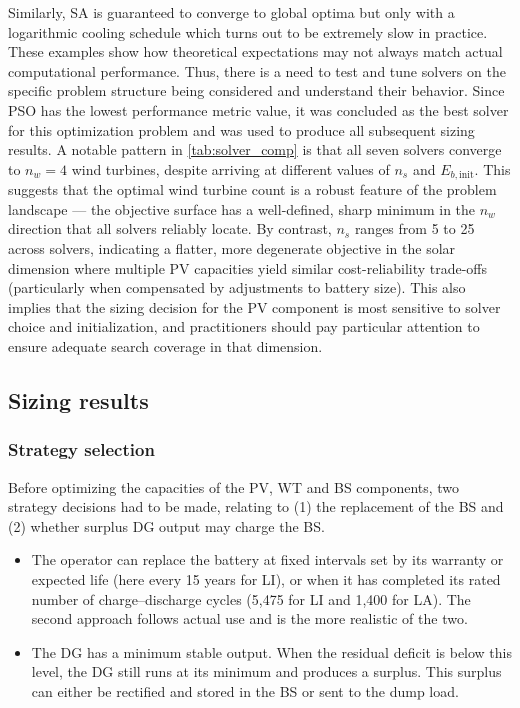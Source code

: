\documentclass[final,3p,times]{elsarticle}
\begin{document}
Similarly, SA is guaranteed to converge to global optima but only with a logarithmic cooling schedule which turns out to be extremely slow in practice.  These examples show how theoretical expectations may not always match actual computational performance. Thus, there is a need to test and tune solvers on the specific problem structure being considered and understand their behavior. Since PSO has the lowest performance metric value, it was concluded as the best solver for this optimization problem and was used to produce all subsequent sizing results. A notable pattern in \cref{tab:solver_comp} is that all seven solvers converge to $n_w = 4$ wind turbines, despite arriving at different values of $n_s$ and $E_{b,\text{init}}$. This suggests that the optimal wind turbine count is a robust feature of the problem landscape --- the objective surface has a well-defined, sharp minimum in the $n_w$ direction that all solvers reliably locate. By contrast, $n_s$ ranges from 5 to 25 across solvers, indicating a flatter, more degenerate objective in the solar dimension where multiple PV capacities yield similar cost-reliability trade-offs (particularly when compensated by adjustments to battery size). This also implies that the sizing decision for the PV component is most sensitive to solver choice and initialization, and practitioners should pay particular attention to ensure adequate search coverage in that dimension.

\subsection{Sizing results}

\subsubsection{\label{sec:strat} Strategy selection}

Before optimizing the capacities of the PV, WT and BS components, two strategy decisions had to be made, relating to (1) the replacement of the BS and (2) whether surplus DG output may charge the BS.
\begin{itemize}
    \item The operator can replace the battery at fixed intervals set by its warranty or expected life (here every 15 years for LI), or when it has completed its rated number of charge--discharge cycles (5,475 for LI and 1,400 for LA). The second approach follows actual use and is the more realistic of the two.
    \item The DG has a minimum stable output. When the residual deficit is below this level, the DG still runs at its minimum and produces a surplus. This surplus can either be rectified and stored in the BS or sent to the dump load.
\end{itemize}
\end{document}

